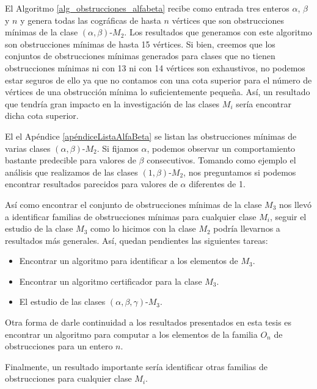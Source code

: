 El Algoritmo \ref{alg_obstrucciones_alfabeta} recibe como entrada tres enteros $\alpha$, $\beta$ y $n$ y genera todas las cográficas de hasta $n$ vértices que son obstrucciones mínimas de la clase $(\alpha,\beta)$-$M_2$. Los resultados que generamos con este algoritmo son obstrucciones mínimas de hasta 15 vértices. Si bien, creemos que los conjuntos de obstrucciones mínimas generados para clases que no tienen obstrucciones mínimas ni con 13 ni con 14 vértices son exhaustivos, no podemos estar seguros de ello ya que no contamos con una cota superior para el número de vértices de una obstrucción mínima lo suficientemente pequeña. Así, un resultado que tendría gran impacto en la investigación de las clases $M_i$ sería encontrar dicha cota superior. 

El el Apéndice \ref{apéndiceListaAlfaBeta} se listan las obstrucciones mínimas de varias clases $(\alpha,\beta)$-$M_2$. Si fijamos $\alpha$, podemos observar un comportamiento bastante predecible para valores de $\beta$ consecutivos. Tomando como ejemplo el análisis que realizamos de las clases $(1,\beta)$-$M_2$, nos preguntamos si podemos encontrar resultados parecidos para valores de $\alpha$ diferentes de 1.

Así como encontrar el conjunto de obstrucciones mínimas de la clase $M_3$ nos llevó a identificar familias de obstrucciones mínimas para cualquier clase $M_i$, seguir el estudio de la clase $M_3$ como lo hicimos con la clase $M_2$ podría llevarnos a resultados más generales. Así, quedan pendientes las siguientes tareas:
\begin{itemize}
    \item Encontrar un algoritmo para identificar a los elementos de $M_3$.
    \item Encontrar un algoritmo certificador para la clase $M_3$.
    \item El estudio de las clases $(\alpha,\beta,\gamma)$-$M_3$.
\end{itemize}

Otra forma de darle continuidad a los resultados presentados en esta tesis es encontrar un algoritmo para computar a los elementos de la familia $O_n$ de obstrucciones para un entero $n$. 

Finalmente, un resultado importante sería identificar otras familias de obstrucciones para cualquier clase $M_i$. 
